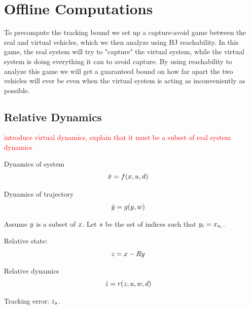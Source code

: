 \section{Offline Computations \label{sec:precomp}}

To precompute the tracking bound we set up a capture-avoid game between the real and virtual vehicles, which we then analyze using HJ reachability. In this game, the real system will try to "capture" the virtual system, while the virtual system is doing everything it can to avoid capture. By using reachability to analyze this game we will get a guaranteed bound on how far apart the two vehicles will ever be even when the virtual system is acting as inconveniently as possible.

\subsection{Relative Dynamics}
\textcolor{red}{introduce virtual dynamics, explain that it must be a subset of real system dynamics}


Dynamics of system
\begin{equation}
\dot{x} = f(x, u, d)
\end{equation}

Dynamics of trajectory
\begin{equation}
\dot{y} = g(y, w)
\end{equation}

Assume $y$ is a subset of $x$. Let $s$ be the set of indices such that $y_i = x_{s_i}$.

Relative state: 
\begin{equation}
z = x - Ry
\end{equation}

Relative dynamics
\begin{equation}
\dot{z} = r(z, u, w, d)
\end{equation}

Tracking error: $z_{s}$.

